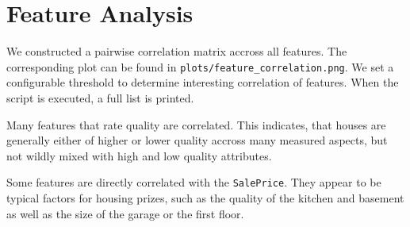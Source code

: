 \section{Feature Analysis}

We constructed a pairwise correlation matrix accross all features. The corresponding plot can be found in \texttt{plots/feature_correlation.png}. We set a configurable threshold to determine interesting correlation of features. When the script is executed, a full list is printed.

Many features that rate quality are correlated. This indicates, that houses are generally either of higher or lower quality accross many measured aspects, but not wildly mixed with high and low quality attributes.

Some features are directly correlated with the \texttt{SalePrice}. They appear to be typical factors for housing prizes, such as the quality of the kitchen and basement as well as the size of the garage or the first floor.